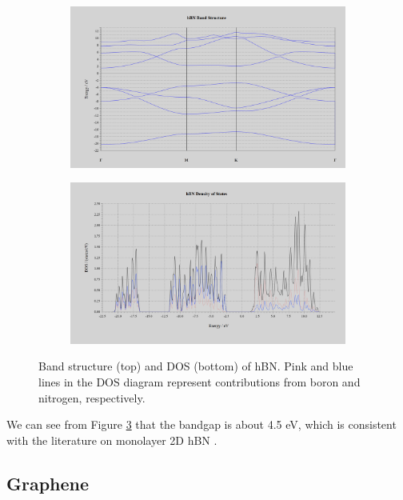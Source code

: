 \documentclass[]{article}
\begin{document}
\begin{figure}[H]
	\centering
	\begin{subfigure}[b]{\textwidth}
		\includegraphics[width = \textwidth]{hbn_band.PNG}
		\label{fig: hbn_band}
	\end{subfigure}
	\hfill
	\begin{subfigure}[b]{\textwidth}
		\includegraphics[width = \textwidth]{hbn_dos.PNG}
		\label{fig: hbn_dos}
	\end{subfigure}
	\caption{Band structure (top) and DOS (bottom) of hBN. Pink and blue lines in the DOS diagram represent contributions from boron and nitrogen, respectively. }
	\label{fig: hbn_dos_band}
\end{figure}


We can see from Figure \ref{fig: hbn_dos_band} that the bandgap is about 4.5 eV, which is consistent with the literature on monolayer 2D hBN \cite{tunable_bandgap_2d_hBN, quantum_emission_hBN_monolayers, 2D_material_nanophotonics_HBN_BANDGAP, hBN_cavity_optomechanics}. 


\newpage
\subsection{Graphene}
\end{document}
